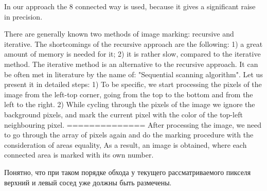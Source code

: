 \documentclass[12pt,a4paper,oneside,titlepage]{article}
\begin{document}
In our approach the 8 connected way is used, because it gives a significant raise in precision.

There are generally known two methods of image marking: recursive and iterative.
The shortcomings of the recursive approach are the following:
1) a great amount of memory is needed for it;
2) it is rather slow, compared to the iterative method.
The iterative method is an alternative to the recursive approach. It can be often met in literature by the name of: "Sequential scanning algorithm".
Let us present it in detailed steps:
1) To be specific, we start processing the pixels of the image from the left-top corner, going from the top to the bottom and from the left to the right.
2) While cycling through the pixels of the image we ignore the background pixels, and mark the current pixel with the color of the top-left neighbouring pixel.
==============
After processing the image, we need to go through the array of pixels again and do the marking procedure with the consideration of areas equality,
As a result, an image is obtained, where each connected area is marked with its own number.

Понятно, что при таком порядке обхода у текущего рассматриваемого пикселя верхний и левый сосед уже должны быть размечены.


\end{document}
